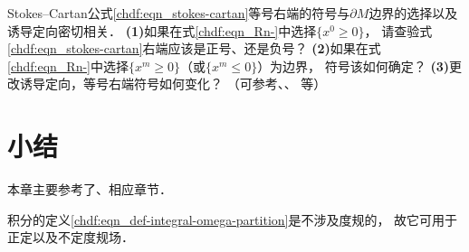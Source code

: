\begin{exercise}
	Stokes--Cartan公式\eqref{chdf:eqn_stokes-cartan}等号右端的符号与$\partial M$边界的选择以及诱导定向密切相关．
	{\bfseries (1)}如果在式\eqref{chdf:eqn_Rn-}中选择$\{x^0 \geqslant 0\}$，
	请查验式\eqref{chdf:eqn_stokes-cartan}右端应该是正号、还是负号？
	{\bfseries (2)}如果在式\eqref{chdf:eqn_Rn-}中选择$\{x^m \geqslant 0\}$（或$\{x^m \leqslant 0\}$）为边界，	符号该如何确定？
	{\bfseries (3)}更改诱导定向，等号右端符号如何变化？
	（可参考\parencite[\S 3.4]{cc2001-zh}、\parencite[\S 5.2]{Luqk-2026}、
	\parencite[\S 22.6]{tu-IM-2011}等）
\end{exercise}


\section*{小结}
本章主要参考了\parencite{cc2001-zh}、\parencite{chenwh2001}相应章节．

积分的定义\eqref{chdf:eqn_def-integral-omega-partition}是不涉及度规的，
故它可用于正定以及不定度规场．


\endinput
